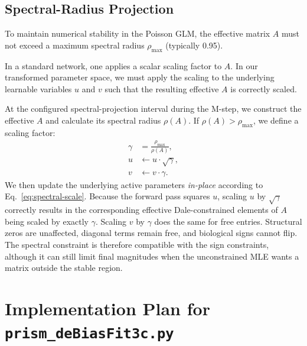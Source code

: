 \documentclass[11pt]{article}
\begin{document}
\subsection{Spectral-Radius Projection}

To maintain numerical stability in the Poisson GLM, the effective matrix $A$ must not exceed a maximum spectral radius $\rho_{\text{max}}$ (typically 0.95).

In a standard network, one applies a scalar scaling factor to $A$. In our transformed parameter space, we must apply the scaling to the underlying learnable variables $u$ and $v$ such that the resulting effective $A$ is correctly scaled.

At the configured spectral-projection interval during the M-step, we construct the effective $A$ and calculate its spectral radius $\rho(A)$. If $\rho(A) > \rho_{\text{max}}$, we define a scaling factor:
\begin{equation}
\label{eq:spectral-scale}
\begin{aligned}
\gamma &= \frac{\rho_{\text{max}}}{\rho(A)},\\
u &\leftarrow u \cdot \sqrt{\gamma},\\
v &\leftarrow v \cdot \gamma .
\end{aligned}
\end{equation}
We then update the underlying active parameters \textit{in-place} according to Eq.~\eqref{eq:spectral-scale}.
Because the forward pass squares $u$, scaling $u$ by $\sqrt{\gamma}$ correctly results in the corresponding effective Dale-constrained elements of $A$ being scaled by exactly $\gamma$. Scaling $v$ by $\gamma$ does the same for free entries. Structural zeros are unaffected, diagonal terms remain free, and biological signs cannot flip. The spectral constraint is therefore compatible with the sign constraints, although it can still limit final magnitudes when the unconstrained MLE wants a matrix outside the stable region.

\section{Implementation Plan for \texttt{prism\_deBiasFit3c.py}}
\end{document}
